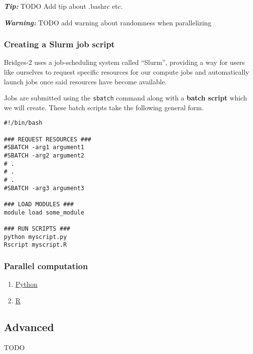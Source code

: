 \documentclass[11pt]{article}
\begin{document}
\textbf{\emph{Tip:}} TODO Add tip about .bashrc etc.

\textbf{\emph{Warning:}} TODO add warning about randomness when parallelizing

\subsubsection{Creating a Slurm job script}
\label{creating-a-slurm-job-script}
Bridges-2 uses a job-scheduling system called ``Slurm'', providing a way
for users like ourselves to request specific resources for our compute
jobs and automatically launch jobs once said resources have become
available.

Jobs are submitted using the \texttt{sbatch} command along with a \textbf{batch
script} which we will create. These batch scripts take the following
general form.

\begin{verbatim}
#!/bin/bash

### REQUEST RESOURCES ###
#SBATCH -arg1 argument1
#SBATCH -arg2 argument2 
# .
# .
# .
#SBATCH -arg3 argument3

### LOAD MODULES ###
module load some_module

### RUN SCRIPTS ###
python myscript.py
Rscript myscript.R
\end{verbatim}

\subsubsection{Parallel computation}
\label{parallel-computation}
\begin{enumerate}
\item \href{examples/python/python\_parallel/README.md}{Python}
\label{python}
\item \href{examples/R/R\_parallel/README.md}{R}
\label{r}
\end{enumerate}
\subsection{Advanced}
\label{advanced}
TODO
\end{document}
